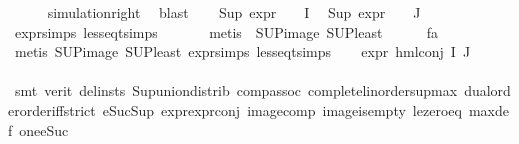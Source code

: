 \begin{isabellebody}
\ \ \ \ \isamarkupfalse%
\ simulation{\isacharunderscore}{\kern0pt}right\ \isamarkupfalse%
\ blast\isanewline
\ \ \isamarkupfalse%
\ {\isachardoublequoteopen}Sup\ {\isacharparenleft}{\kern0pt}{\isacharparenleft}{\kern0pt}expr{\isacharunderscore}{\kern0pt}{}\ {\isasymcirc}\ {\isasymPhi}{\isacharparenright}{\kern0pt}\ {\isacharbackquote}{\kern0pt}\ I{\isacharparenright}{\kern0pt}\ {\isasymle}\ {}{\isachardoublequoteclose}\isanewline
{\isachardoublequoteopen}Sup\ {\isacharparenleft}{\kern0pt}{\isacharparenleft}{\kern0pt}expr{\isacharunderscore}{\kern0pt}{}\ {\isasymcirc}\ {\isasymPhi}{\isacharparenright}{\kern0pt}\ {\isacharbackquote}{\kern0pt}\ J{\isacharparenright}{\kern0pt}\ {\isasymle}\ {}{\isachardoublequoteclose}\isanewline
\ \ \ \ \isamarkupfalse%
\ expr{\isachardot}{\kern0pt}simps\ less{\isacharunderscore}{\kern0pt}eq{\isacharunderscore}{\kern0pt}t{\isachardot}{\kern0pt}simps\isanewline
\ \ \ \ \ \isamarkupfalse%
\ {\isacharparenleft}{\kern0pt}metis\ {\isachardoublequoteopen}{}{\isachardoublequoteclose}\ SUP{\isacharunderscore}{\kern0pt}image\ SUP{\isacharunderscore}{\kern0pt}least{\isacharparenright}{\kern0pt}\isanewline
\ \ \ \ \isamarkupfalse%
\ fa\isanewline
\ \ \ \ \isamarkupfalse%
\ {\isacharparenleft}{\kern0pt}metis\ SUP{\isacharunderscore}{\kern0pt}image\ SUP{\isacharunderscore}{\kern0pt}least\ expr{\isachardot}{\kern0pt}simps\ less{\isacharunderscore}{\kern0pt}eq{\isacharunderscore}{\kern0pt}t{\isachardot}{\kern0pt}simps{\isacharparenright}{\kern0pt}\isanewline
\ \ \isamarkupfalse%
\ {\isachardoublequoteopen}expr{\isacharunderscore}{\kern0pt}{}\ {\isacharparenleft}{\kern0pt}hml{\isacharunderscore}{\kern0pt}conj\ I\ J\ {\isasymPhi}{\isacharparenright}{\kern0pt}\ {\isasymle}\ {}{\isachardoublequoteclose}\isanewline
\ \ \ \ \isamarkupfalse%
\ {\isacharparenleft}{\kern0pt}smt\ {\isacharparenleft}{\kern0pt}verit{\isacharcomma}{\kern0pt}\ del{\isacharunderscore}{\kern0pt}insts{\isacharparenright}{\kern0pt}\ Sup{\isacharunderscore}{\kern0pt}union{\isacharunderscore}{\kern0pt}distrib\ comp{\isacharunderscore}{\kern0pt}assoc\ complete{\isacharunderscore}{\kern0pt}linorder{\isacharunderscore}{\kern0pt}sup{\isacharunderscore}{\kern0pt}max\ dual{\isacharunderscore}{\kern0pt}order{\isachardot}{\kern0pt}order{\isacharunderscore}{\kern0pt}iff{\isacharunderscore}{\kern0pt}strict\ eSuc{\isacharunderscore}{\kern0pt}Sup\ expr{\isacharunderscore}{\kern0pt}{}{\isachardot}{\kern0pt}expr{\isacharunderscore}{\kern0pt}{}{\isacharunderscore}{\kern0pt}conj\ image{\isacharunderscore}{\kern0pt}comp\ image{\isacharunderscore}{\kern0pt}is{\isacharunderscore}{\kern0pt}empty\ le{\isacharunderscore}{\kern0pt}zero{\isacharunderscore}{\kern0pt}eq\ max{\isacharunderscore}{\kern0pt}def\ one{\isacharunderscore}{\kern0pt}eSuc{\isacharparenright}{\kern0pt}\isanewline

\end{isabellebody}
